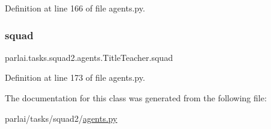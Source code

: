 Definition at line 166 of file agents.\+py.

\mbox{\label{classparlai_1_1tasks_1_1squad2_1_1agents_1_1TitleTeacher_a192c7e24f0159dcb8c512526e7f8a1fb}} 
\subsubsection{\texorpdfstring{squad}{squad}}
{\footnotesize\ttfamily parlai.\+tasks.\+squad2.\+agents.\+Title\+Teacher.\+squad}



Definition at line 173 of file agents.\+py.



The documentation for this class was generated from the following file\+:\begin{DoxyCompactItemize}
\item 
parlai/tasks/squad2/\hyperlink{parlai_2tasks_2squad2_2agents_8py}{agents.\+py}\end{DoxyCompactItemize}

